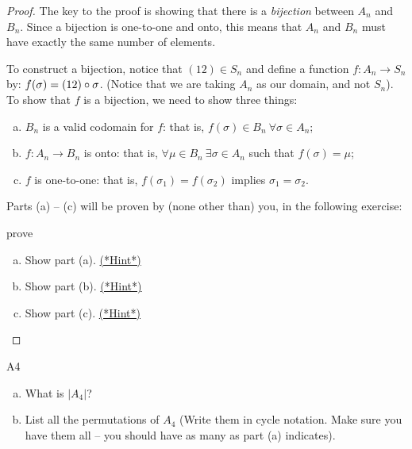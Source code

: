  \begin{proof}
The key to the proof is showing that there is a \emph{bijection} between $A_n$  and $B_n$. Since a bijection is one-to-one and onto, this means that $A_n$ and $B_n$ must have
exactly the same number of elements.

To construct a bijection, notice that $(1 2) \in S_n$ and define a function $f: A_n \rightarrow S_n$ by: $f(\sigma) = (1 2) \circ \sigma$. (Notice that we are taking $A_n$ as our domain, and not $S_n$).
To show that $f$ is a bijection, we need to show three things:
\begin{enumerate}[(a)]
\item
$B_n$ is a valid codomain for $f$: that is, $f(\sigma) \in B_n ~\forall \sigma \in A_n$;
\item
$f:A_n \rightarrow B_n$ is onto: that is, $\forall \mu \in B_n ~\exists \sigma \in A_n$ such that $f(\sigma) = \mu$;
 \item
$f$ is one-to-one: that is, $f(\sigma_1) = f(\sigma_2)$ implies $\sigma_1 = \sigma_2$.
\end{enumerate}

Parts (a) -- (c) will be proven by (none other than) you, in the following exercise:

\begin{exercise}{prove}
\begin{enumerate}[(a)]
\item
Show part (a).  
\hyperref[sec:permute:hints]{(*Hint*)}
\item
Show part (b). 
\hyperref[sec:permute:hints]{(*Hint*)}
\item
Show part (c). 
\hyperref[sec:permute:hints]{(*Hint*)}
\end{enumerate}
\end{exercise}

\end{proof}
 
\begin{exercise}{A4}
\begin{enumerate}[(a)]
\item 
What is $| A_4 |$?
\item
List all the permutations of $A_4$ (Write them in cycle notation. Make sure you have them all -- you should have as many as part (a) indicates).
\end{enumerate}
\end{exercise}

